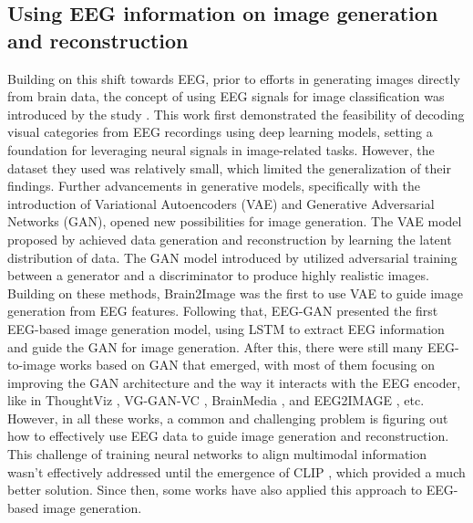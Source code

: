 \documentclass{article}
\begin{document}
\subsection{Using EEG information on image generation and reconstruction}

Building on this shift towards EEG, prior to efforts in generating images directly from brain data, the concept of using EEG signals for image classification was introduced by the study \cite{8099962}. This work first demonstrated the feasibility of decoding visual categories from EEG recordings using deep learning models, setting a foundation for leveraging neural signals in image-related tasks. However, the dataset they used was relatively small, which limited the generalization of their findings. Further advancements in generative models, specifically with the introduction of Variational Autoencoders (VAE) and Generative Adversarial Networks (GAN), opened new possibilities for image generation. The VAE model proposed by \cite{kingma_welling_2013, kingma_welling_2019} achieved data generation and reconstruction by learning the latent distribution of data. The GAN model introduced by \cite{goodfellow_2014} utilized adversarial training between a generator and a discriminator to produce highly realistic images. Building on these methods, Brain2Image \cite{brain2img} was the first to use VAE to guide image generation from EEG features. Following that, EEG-GAN \cite{palazzo_spampinato_kavasidis_giordano_shah} presented the first EEG-based image generation model, using LSTM \cite{lstm_1997} to extract EEG information and guide the GAN for image generation. After this, there were still many EEG-to-image works based on GAN that emerged, with most of them focusing on improving the GAN architecture and the way it interacts with the EEG encoder, like in ThoughtViz \cite{ThoughtViz_2018}, VG-GAN-VC \cite{jiao_you_yang_li_zhang_shen_2019}, BrainMedia \cite{BrainMedia_2020}, and EEG2IMAGE \cite{singh_pandey_miyapuram_raman_2023}, etc. However, in all these works, a common and challenging problem is figuring out how to effectively use EEG data to guide image generation and reconstruction. 
This challenge of training neural networks to align multimodal information wasn't effectively addressed until the emergence of CLIP \cite{clip_2021}, which provided a much better solution. Since then, some works have also applied this approach to EEG-based image generation.
\end{document}
